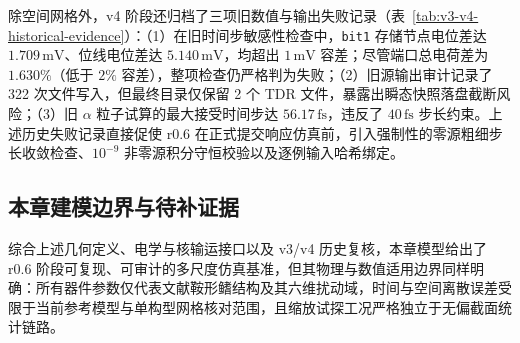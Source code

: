 除空间网格外，v4 阶段还归档了三项旧数值与输出失败记录（表~\ref{tab:v3-v4-historical-evidence}）：（1）在旧时间步敏感性检查中，\texttt{bit1} 存储节点电位差达 $1.709\,\mathrm{mV}$、位线电位差达 $5.140\,\mathrm{mV}$，均超出 $1\,\mathrm{mV}$ 容差；尽管端口总电荷差为 $1.630\%$（低于 $2\%$ 容差），整项检查仍严格判为失败；（2）旧源输出审计记录了 322 次文件写入，但最终目录仅保留 2 个 TDR 文件，暴露出瞬态快照落盘截断风险；（3）旧 $\alpha$ 粒子试算的最大接受时间步达 $56.17\,\mathrm{fs}$，违反了 $40\,\mathrm{fs}$ 步长约束。上述历史失败记录直接促使 r0.6 在正式提交响应仿真前，引入强制性的零源粗细步长收敛检查、$10^{-9}$ 非零源积分守恒校验以及逐例输入哈希绑定。



\subsection{本章建模边界与待补证据}
\label{subsec:ch02-boundaries}

综合上述几何定义、电学与核输运接口以及 v3/v4 历史复核，本章模型给出了 r0.6 阶段可复现、可审计的多尺度仿真基准，但其物理与数值适用边界同样明确：所有器件参数仅代表文献鞍形鳍结构及其六维扰动域，时间与空间离散误差受限于当前参考模型与单构型网格核对范围，且缩放试探工况严格独立于无偏截面统计链路。

